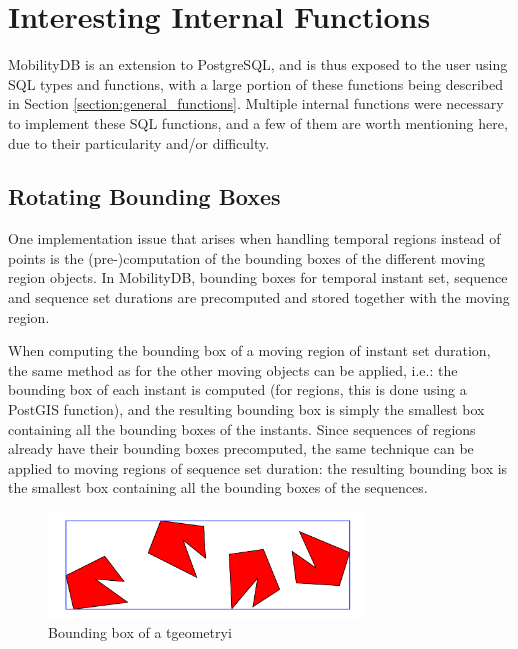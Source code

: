 
\section{Interesting Internal Functions}
\label{section:internal_functions}

MobilityDB is an extension to PostgreSQL, and is thus exposed to the user using SQL types and functions, with a large portion of these functions being described in Section \ref{section:general_functions}. Multiple internal functions were necessary to implement these SQL functions, and a few of them are worth mentioning here, due to their particularity and/or difficulty.

\subsection{Rotating Bounding Boxes}
\label{section:bbox}

One implementation issue that arises when handling temporal regions instead of points is the (pre-)computation of the bounding boxes of the different moving region objects. In MobilityDB, bounding boxes for temporal instant set, sequence and sequence set durations are precomputed and stored together with the moving region.
    
When computing the bounding box of a moving region of instant set duration, the same method as for the other moving objects can be applied, i.e.: the bounding box of each instant is computed (for regions, this is done using a PostGIS function), and the resulting bounding box is simply the smallest box containing all the bounding boxes of the instants. Since sequences of regions already have their bounding boxes precomputed, the same technique can be applied to moving regions of sequence set duration: the resulting bounding box is the smallest box containing all the bounding boxes of the sequences.

\begin{figure}[h!]
    \centering
    \includegraphics[width=0.75\textwidth]{images/tgeometryi_bbox.pdf}
    \caption{Bounding box of a tgeometryi}
    \label{fig:tgeometryi_bbox}
\end{figure}


